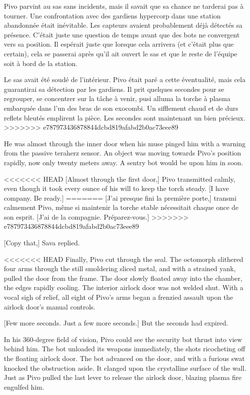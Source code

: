 Pivo parvint au sas sans incidents, mais il savait que sa chance ne tarderai pas à tourner. Une confrontation avec des gardiens hypercorp dans une station abandonnée était inévitable. Les capteurs avaient probablement déjà détectés sa présence. C'était juste une question de temps avant que des bots ne convergent vers sa position. Il espérait juste que lorsque cela arrivera (et c'était plus que certain), cela se passerai après qu'il ait ouvert le sas et que le reste de l'équipe soit à bord de la station. 

Le sas avait été soudé de l'intérieur. Pivo était paré a cette éventualité, mais cela guarantirai sa détection par les gardiens. Il prit quelques secondes pour se regrouper, se concentrer sur la tâche à venir, pusi alluma la torche à plasma embarquée dans l'un des bras de son exocombi. Un sifflement chaud et de durs reflets bleutés emplirent la pièce. Les secondes sont maintenant un bien précieux. 
>>>>>>> e787973436878844dcbd819afabd2b0ac73eee89

He was almost through the inner door when his muse pinged him with a warning from the passive teraherz sensor. An object was moving towards Pivo's position rapidly, now only twenty meters away. A sentry bot would be upon him in soon. 

<<<<<<< HEAD
[Almost through the first door,] Pivo transmitted calmly, even though it took every ounce of his will to keep the torch steady. [I have company. Be ready.] 
=======
[J'ai presque fini la première porte,] transmi calmement Pivo, même si maintenir la torche stable nécessitait chaque once de son esprit. [J'ai de la compagnie. Préparez-vous.] 
>>>>>>> e787973436878844dcbd819afabd2b0ac73eee89

[Copy that,] Sava replied. 

<<<<<<< HEAD
Finally, Pivo cut through the seal. The octomorph slithered four arms through the still smoldering sliced metal, and with a strained yank, pulled the door from the frame. The door slowly floated away into the chamber, the edges rapidly cooling. The interior airlock door was not welded shut. With a vocal sigh of relief, all eight of Pivo's arms began a frenzied assault upon the airlock door's manual controls. 

[Few more seconds. Just a few more seconds.] But the seconds had expired. 

In his 360-degree field of vision, Pivo could see the security bot thrust into view behind him. The bot unloaded its weapons immediately, the shots ricocheting off the floating airlock door. The bot advanced on the door, and with a furious swat knocked the obstruction aside. It clanged upon the crystalline surface of the wall. Just as Pivo pulled the last lever to release the airlock door, blazing plasma fire engulfed him. 


